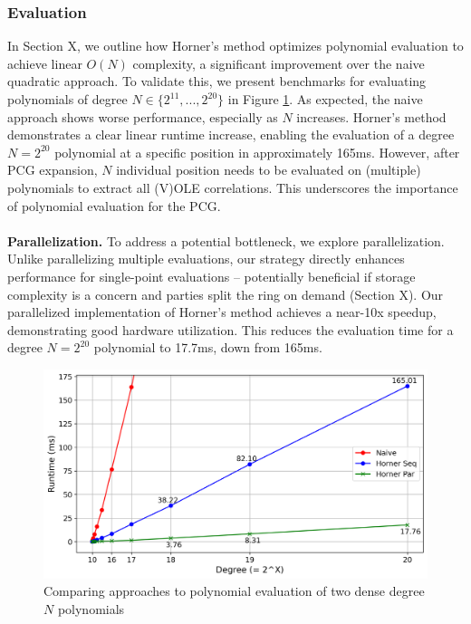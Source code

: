 \subsubsection{Evaluation}
In Section X, we outline how Horner's method optimizes polynomial evaluation to achieve linear $O(N)$ complexity, a significant improvement over the naive quadratic approach. To validate this, we present benchmarks for evaluating polynomials of degree $N \in \{2^{11}, ..., 2^{20}\}$ in Figure \ref{fig:polyEvalBench}. As expected, the naive approach shows worse performance, especially as $N$ increases. Horner's method demonstrates a clear linear runtime increase, enabling the evaluation of a degree $N=2^{20}$ polynomial at a specific position in approximately 165ms. However, after PCG expansion, $N$ individual position needs to be evaluated on (multiple) polynomials to extract all (V)OLE correlations. This underscores the importance of polynomial evaluation for the PCG.
\\\\
\textbf{Parallelization.} To address a potential bottleneck, we explore parallelization. Unlike parallelizing multiple evaluations, our strategy directly enhances performance for single-point evaluations – potentially beneficial if storage complexity is a concern and parties split the ring on demand (Section X). Our parallelized implementation of Horner's method achieves a near-10x speedup, demonstrating good hardware utilization. This reduces the evaluation time for a degree $N=2^{20}$ polynomial to 17.7ms, down from 165ms.

\begin{figure}[h!]
    \centering
    \includegraphics[scale=0.49]{images/plots/poly_eval.png}
    \caption{Comparing approaches to polynomial evaluation of two dense degree $N$ polynomials}
    \label{fig:polyEvalBench}
\end{figure}


